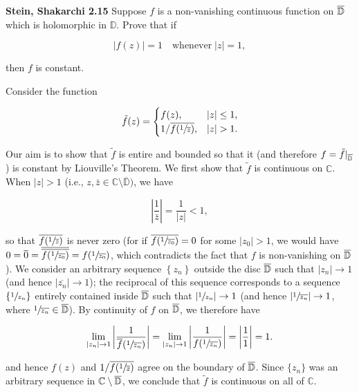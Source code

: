 \textbf{Stein, Shakarchi 2.15}
Suppose $f$ is a non-vanishing continuous function on $\overline{\mathbb{D}}$ which is holomorphic in $\mathbb{D}$. Prove
that if

$$
\left| f(z) \right| = 1 \quad \text{whenever} \; |z| = 1,
$$

then $f$ is constant.

\begin{solution}
    Consider the function

    $$
    \tilde{f}(z) = \begin{cases}
        f(z), &|z| \le 1, \\
        1 / \overline{f(\sfrac{1}{\overline{z}})}, &|z| > 1.
    \end{cases}
    $$

    Our aim is to show that $\tilde{f}$ is entire and bounded so that it (and therefore 
    $f = \tilde{f}\vert_{\overline{\mathbb{D}}}$) is constant by Liouville's Theorem. We first show that $\tilde{f}$ is 
    continuous on $\mathbb{C}$. When $|z| > 1$ (i.e., $z, \bar{z} \in \mathbb{C} \setminus \overline{\mathbb{D}})$, we have

    $$
    \left| \frac{1}{\bar{z}} \right| = \frac{1}{|z|} < 1,
    $$

    so that $\overline{f(\sfrac{1}{\overline{z}})}$ is never zero (for if $\overline{f(\sfrac{1}{\overline{z_0}})} = 0$ 
    for some $|z_0| > 1$, we would have 
    $0 = \overline{0} = \overline{\overline{f(\sfrac{1}{\overline{z_0}})}} = f(\sfrac{1}{\overline{z_0}})$, which
    contradicts the fact that $f$ is non-vanishing on $\overline{\mathbb{D}}$). We consider an arbitrary sequence $\left\{z_n\right\}$ 
    outside the disc $\overline{\mathbb{D}}$ such that $|z_n| \to 1$ (and hence $\left|\overline{z_n}\right| \to 1$); the reciprocal 
    of this sequence corresponds to a sequence $\left\{ \sfrac{1}{z_n} \right\}$ entirely contained inside $\overline{\mathbb{D}}$ 
    such that $\left| \sfrac{1}{z_n} \right| \to 1$ (and hence $\left| \sfrac{1}{\overline{z_n}} \right| \to 1$, where 
    $\sfrac{1}{\overline{z_n}} \in \overline{\mathbb{D}}$). By continuity of $f$ on $\overline{\mathbb{D}}$, we therefore have

    $$
    \lim_{\left| z_n \right| \to 1} \left| \frac{1}{\overline{f}(\sfrac{1}{\overline{z_n}})} \right|
    = \lim_{\left| z_n \right| \to 1} \left| \frac{1}{f(\sfrac{1}{\overline{z_n}})} \right|
    = \left| \frac{1}{1} \right|
    = 1.
    $$

    and hence $f(z)$ and $1 / \overline{f(\sfrac{1}{\overline{z}})}$ agree on the boundary of $\overline{\mathbb{D}}$. Since 
    $\{z_n\}$ was an arbitrary sequence in $\mathbb{C} \setminus \overline{\mathbb{D}}$, we conclude that $\tilde{f}$ is continuous
    on all of $\mathbb{C}$. 
    

\end{solution}
